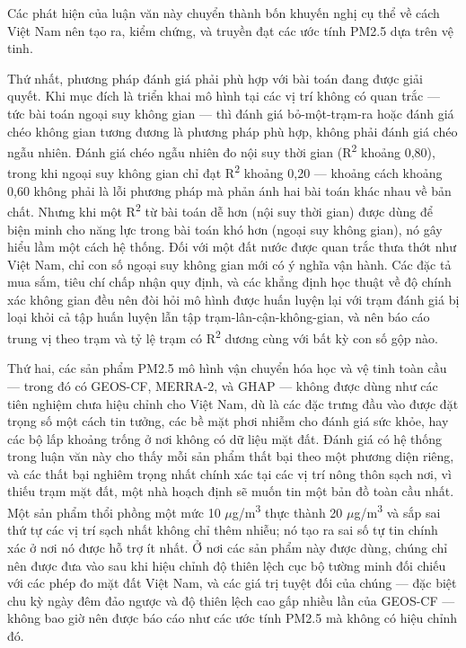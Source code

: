 Các phát hiện của luận văn này chuyển thành bốn khuyến nghị cụ thể về cách Việt Nam nên tạo ra, kiểm chứng, và truyền đạt các ước tính PM2.5 dựa trên vệ tinh.

Thứ nhất, phương pháp đánh giá phải phù hợp với bài toán đang được giải quyết. Khi mục đích là triển khai mô hình tại các vị trí không có quan trắc --- tức bài toán ngoại suy không gian --- thì đánh giá bỏ-một-trạm-ra hoặc đánh giá chéo không gian tương đương là phương pháp phù hợp, không phải đánh giá chéo ngẫu nhiên. Đánh giá chéo ngẫu nhiên đo nội suy thời gian (R\textsuperscript{2} khoảng 0,80), trong khi ngoại suy không gian chỉ đạt R\textsuperscript{2} khoảng 0,20 --- khoảng cách khoảng 0,60 không phải là lỗi phương pháp mà phản ánh hai bài toán khác nhau về bản chất. Nhưng khi một R\textsuperscript{2} từ bài toán dễ hơn (nội suy thời gian) được dùng để biện minh cho năng lực trong bài toán khó hơn (ngoại suy không gian), nó gây hiểu lầm một cách hệ thống. Đối với một đất nước được quan trắc thưa thớt như Việt Nam, chỉ con số ngoại suy không gian mới có ý nghĩa vận hành. Các đặc tả mua sắm, tiêu chí chấp nhận quy định, và các khẳng định học thuật về độ chính xác không gian đều nên đòi hỏi mô hình được huấn luyện lại với trạm đánh giá bị loại khỏi cả tập huấn luyện lẫn tập trạm-lân-cận-không-gian, và nên báo cáo trung vị theo trạm và tỷ lệ trạm có R\textsuperscript{2} dương cùng với bất kỳ con số gộp nào.

Thứ hai, các sản phẩm PM2.5 mô hình vận chuyển hóa học và vệ tinh toàn cầu --- trong đó có GEOS-CF, MERRA-2, và GHAP --- không được dùng như các tiên nghiệm chưa hiệu chỉnh cho Việt Nam, dù là các đặc trưng đầu vào được đặt trọng số một cách tin tưởng, các bề mặt phơi nhiễm cho đánh giá sức khỏe, hay các bộ lấp khoảng trống ở nơi không có dữ liệu mặt đất. Đánh giá có hệ thống trong luận văn này cho thấy mỗi sản phẩm thất bại theo một phương diện riêng, và các thất bại nghiêm trọng nhất chính xác tại các vị trí nông thôn sạch nơi, vì thiếu trạm mặt đất, một nhà hoạch định sẽ muốn tin một bản đồ toàn cầu nhất. Một sản phẩm thổi phồng một mức 10 $\mu$g/m\textsuperscript{3} thực thành 20 $\mu$g/m\textsuperscript{3} và sắp sai thứ tự các vị trí sạch nhất không chỉ thêm nhiễu; nó tạo ra sai số tự tin chính xác ở nơi nó được hỗ trợ ít nhất. Ở nơi các sản phẩm này được dùng, chúng chỉ nên được đưa vào sau khi hiệu chỉnh độ thiên lệch cục bộ tường minh đối chiếu với các phép đo mặt đất Việt Nam, và các giá trị tuyệt đối của chúng --- đặc biệt chu kỳ ngày đêm đảo ngược và độ thiên lệch cao gấp nhiều lần của GEOS-CF --- không bao giờ nên được báo cáo như các ước tính PM2.5 mà không có hiệu chỉnh đó.

